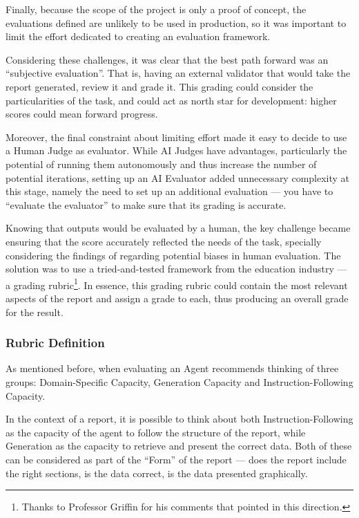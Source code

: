 \documentclass[a4paper]{report}
\begin{document}
Finally, because the scope of the project is only a proof of concept, the evaluations defined are unlikely to be used in production, so it was important to limit the effort dedicated to creating an evaluation framework.

Considering these challenges, it was clear that the best path forward was an ``subjective evaluation''. That is, having an external validator that would take the report generated, review it and grade it. This grading could consider the particularities of the task, and could act as north star for development: higher scores could mean forward progress.

Moreover, the final constraint about limiting effort made it easy to decide to use a Human Judge as evaluator. While AI Judges have advantages, particularly the potential of running them autonomously and thus increase the number of potential iterations, setting up an AI Evaluator added unnecessary complexity at this stage, namely the need to set up an additional evaluation --- you have to ``evaluate the evaluator'' to make sure that its grading is accurate.

Knowing that outputs would be evaluated by a human, the key challenge became ensuring that the score accurately reflected the needs of the task, specially considering the findings of \cite{hu2023decipher} regarding potential biases in human evaluation. The solution was to use a tried-and-tested framework from the education industry --- a grading rubric\footnote{Thanks to Professor Griffin for his comments that pointed in this direction.}. In essence, this grading rubric could contain the most relevant aspects of the report and assign a grade to each, thus producing an overall grade for the result. 

\subsubsection{Rubric Definition}

As mentioned before, when evaluating an Agent \cite{aiebook2025} recommends thinking of three groups: Domain-Specific Capacity, Generation Capacity and Instruction-Following Capacity.

In the context of a report, it is possible to think about both Instruction-Following as the capacity of the agent to follow the structure of the report, while Generation as the capacity to retrieve and present the correct data. Both of these can be considered as part of the ``Form'' of the report --- does the report include the right sections, is the data correct, is the data presented graphically.
\end{document}
